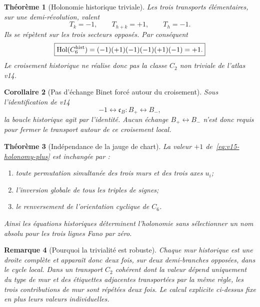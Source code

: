 \documentclass[11pt,a4paper]{article}
\newtheorem{theorem}{Théorème}[section]
\newtheorem{corollary}[theorem]{Corollaire}
\newtheorem{remark}[theorem]{Remarque}
\begin{document}
\begin{theorem}[Holonomie historique triviale]\label{thm:v15-historical-holonomy}
Les trois transports élémentaires, sur une demi-révolution, valent
\[
 T_k=-1,
 \qquad
 T_{h+k}=+1,
 \qquad
 T_h=-1.
\]
Ils se répètent sur les trois secteurs opposés. Par conséquent
\begin{equation}\label{eq:v15-holonomy-plus}
 \boxed{
 \operatorname{Hol}(C_6^{\rm hist})
 =(-1)(+1)(-1)(-1)(+1)(-1)
 =+1.}
\end{equation}
Le croisement historique ne réalise donc pas la classe $C_2$ non triviale de l'atlas v14.
\end{theorem}

\begin{corollary}[Pas d'échange Binet forcé autour du croisement]\label{cor:v15-no-Binet-swap}
Sous l'identification de v14
\[
 -1\longleftrightarrow \mathfrak c_B:
 B_+\leftrightarrow B_-,
\]
la boucle historique agit par l'identité. Aucun échange $B_+\leftrightarrow B_-$ n'est donc requis pour fermer le transport autour de ce croisement local.
\end{corollary}

\begin{theorem}[Indépendance de la jauge de chart]\label{thm:v15-chart-gauge}
La valeur $+1$ de~\eqref{eq:v15-holonomy-plus} est inchangée par :
\begin{enumerate}[label=\textup{(\roman*)}]
\item toute permutation simultanée des trois murs et des trois axes $u_i$;
\item l'inversion globale de tous les triples de signes;
\item le renversement de l'orientation cyclique de $C_6$.
\end{enumerate}
Ainsi les équations historiques déterminent l'holonomie sans sélectionner un nom absolu pour les trois lignes Fano par zéro.
\end{theorem}

\begin{remark}[Pourquoi la trivialité est robuste]
Chaque mur historique est une droite complète et apparaît donc deux fois, sur deux demi-branches opposées, dans le cycle local. Dans un transport $C_2$ cohérent dont la valeur dépend uniquement du type de mur et des étiquettes adjacentes transportées par la même règle, les trois contributions de mur sont répétées deux fois. Le calcul explicite ci-dessus fixe en plus leurs valeurs individuelles.
\end{remark}
\end{document}
